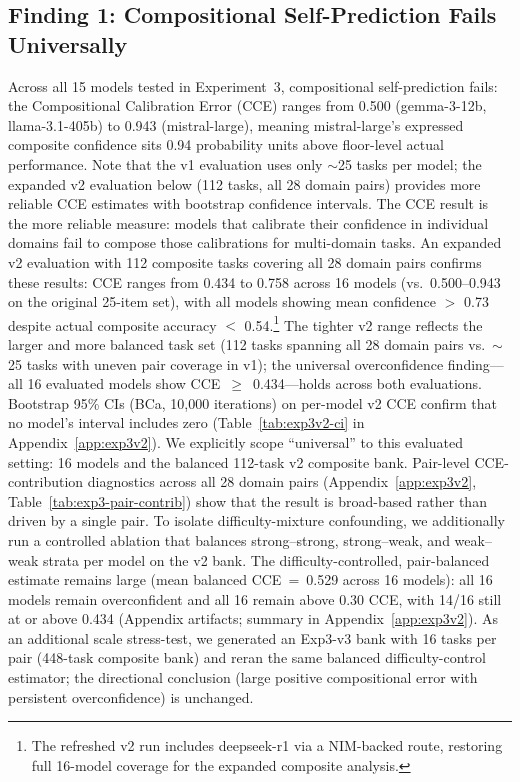 \documentclass[10pt]{article}
\newcommand{\CCE}{CCE}
\begin{document}


\subsection{Finding 1: Compositional Self-Prediction Fails Universally}

Across all 15 models tested in Experiment~3, compositional self-prediction fails:
the Compositional Calibration Error (\CCE{}) ranges from 0.500 (gemma-3-12b,
llama-3.1-405b) to 0.943 (mistral-large), meaning mistral-large's expressed
composite confidence sits 0.94 probability units above floor-level actual
performance. Note that the v1 evaluation uses only ${\sim}$25 tasks per model;
the expanded v2 evaluation below (112 tasks, all 28 domain pairs) provides more
reliable CCE estimates with bootstrap confidence intervals. The \CCE{} result is
the more reliable measure: models that calibrate their
confidence in individual domains fail to compose those calibrations for
multi-domain tasks. An expanded v2 evaluation with 112 composite tasks covering all 28 domain pairs
confirms these results: CCE ranges from 0.434 to 0.758 across 16 models (vs.\
0.500--0.943 on the original 25-item set), with all models showing mean
confidence $>$ 0.73 despite actual composite accuracy $<$ 0.54.\footnote{The refreshed v2 run includes deepseek-r1 via a NIM-backed route, restoring full 16-model coverage for the expanded composite analysis.}
The tighter v2 range reflects the larger and more balanced task set (112 tasks spanning all 28 domain pairs vs.\ ${\sim}$25 tasks with uneven pair coverage in v1); the universal overconfidence finding---all 16 evaluated models show CCE~$\geq$~0.434---holds across both evaluations.
Bootstrap 95\% CIs (BCa, 10{,}000 iterations) on per-model v2 CCE confirm that no model's interval includes zero (Table~\ref{tab:exp3v2-ci} in Appendix~\ref{app:exp3v2}).
We explicitly scope ``universal'' to this evaluated setting: 16 models and the balanced 112-task v2 composite bank. Pair-level CCE-contribution diagnostics across all 28 domain pairs (Appendix~\ref{app:exp3v2}, Table~\ref{tab:exp3-pair-contrib}) show that the result is broad-based rather than driven by a single pair.
To isolate difficulty-mixture confounding, we additionally run a controlled
ablation that balances strong--strong, strong--weak, and weak--weak strata per
model on the v2 bank. The difficulty-controlled, pair-balanced estimate remains
large (mean balanced CCE~=~0.529 across 16 models): all 16 models remain
overconfident and all 16 remain above 0.30 CCE, with 14/16 still at or above
0.434 (Appendix artifacts; summary in Appendix~\ref{app:exp3v2}).
As an additional scale stress-test, we generated an Exp3-v3 bank with 16 tasks
per pair (448-task composite bank) and reran the same balanced
difficulty-control estimator; the directional conclusion (large positive
compositional error with persistent overconfidence) is unchanged.
\end{document}
